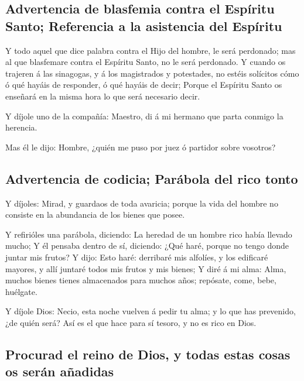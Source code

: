 \hypertarget{advertencia-de-blasfemia-contra-el-espuxedritu-santo-referencia-a-la-asistencia-del-espuxedritu}{%
\subsection{Advertencia de blasfemia contra el Espíritu Santo;
Referencia a la asistencia del
Espíritu}\label{advertencia-de-blasfemia-contra-el-espuxedritu-santo-referencia-a-la-asistencia-del-espuxedritu}}

 Y todo aquel que dice palabra contra el Hijo del hombre,
le será perdonado; mas al que blasfemare contra el Espíritu Santo, no le
será perdonado.  Y cuando os trajeren á las sinagogas, y
á los magistrados y potestades, no estéis solícitos cómo ó qué hayáis de
responder, ó qué hayáis de decir;  Porque el Espíritu
Santo os enseñará en la misma hora lo que será necesario decir.

 Y díjole uno de la compañía: Maestro, di á mi hermano
que parta conmigo la herencia.

 Mas él le dijo: Hombre, ¿quién me puso por juez ó
partidor sobre vosotros?

\hypertarget{advertencia-de-codicia-paruxe1bola-del-rico-tonto}{%
\subsection{Advertencia de codicia; Parábola del rico
tonto}\label{advertencia-de-codicia-paruxe1bola-del-rico-tonto}}

 Y díjoles: Mirad, y guardaos de toda avaricia; porque la
vida del hombre no consiste en la abundancia de los bienes que posee.

 Y refirióles una parábola, diciendo: La heredad de un
hombre rico había llevado mucho;  Y él pensaba dentro de
sí, diciendo: ¿Qué haré, porque no tengo donde juntar mis frutos?
 Y dijo: Esto haré: derribaré mis alfolíes, y los
edificaré mayores, y allí juntaré todos mis frutos y mis bienes;
 Y diré á mi alma: Alma, muchos bienes tienes almacenados
para muchos años; repósate, come, bebe, huélgate.

 Y díjole Dios: Necio, esta noche vuelven á pedir tu
alma; y lo que has prevenido, ¿de quién será?  Así es el
que hace para sí tesoro, y no es rico en Dios.

\hypertarget{procurad-el-reino-de-dios-y-todas-estas-cosas-os-seruxe1n-auxf1adidas}{%
\subsection{Procurad el reino de Dios, y todas estas cosas os serán
añadidas}\label{procurad-el-reino-de-dios-y-todas-estas-cosas-os-seruxe1n-auxf1adidas}}

